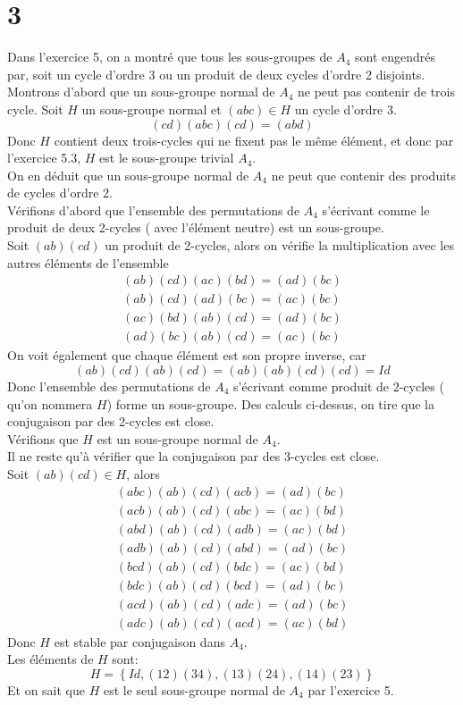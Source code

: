 \documentclass[11pt, a4paper, twoside]{article}
\begin{document}
\section*{3}
Dans l'exercice 5, on a montré que tous les sous-groupes de $A_4$ sont engendrés par, soit un cycle d'ordre 3 ou un produit de deux cycles d'ordre 2 disjoints.\\
Montrons d'abord que un sous-groupe normal de $A_4$ ne peut pas contenir de trois cycle.
Soit $H$ un sous-groupe normal et $( abc)\in H $ un cycle d'ordre 3.
\[ 
	( cd)(abc ) ( cd) = ( abd) 
\]
Donc $H$ contient deux trois-cycles qui ne fixent pas le même élément, et donc par l'exercice 5.3, $H$ est le sous-groupe trivial $A_4$.\\
On en déduit que un sous-groupe normal de $A_4$ ne peut que contenir des produits de cycles d'ordre 2.\\
Vérifions d'abord que l'ensemble des permutations de $A_4$ s'écrivant comme le produit de deux 2-cycles ( avec l'élément neutre)  est un sous-groupe.\\
Soit $( ab) ( cd) $ un produit de 2-cycles, alors on vérifie la multiplication avec les autres éléments de l'ensemble
\begin{align*}
	( ab) ( cd) ( ac) ( bd) = ( ad) ( bc) \\
	( ab) ( cd) ( ad) ( bc) = ( ac) ( bc) \\
	( ac) ( bd) ( ab) ( cd)= ( ad) ( bc) \\
	 ( ad) ( bc) ( ab) ( cd)= ( ac) ( bc)
\end{align*}
On voit également que chaque élément est son propre inverse, car
\[ 
	( ab) ( cd) ( ab) ( cd) = ( ab) ( ab) ( cd) ( cd) = Id
\]
Donc l'ensemble des permutations de $A_4$ s'écrivant comme produit de 2-cycles ( qu'on nommera $H$) forme un sous-groupe.
Des calculs ci-dessus, on tire que la conjugaison par des 2-cycles est close.\\
Vérifions que $H$ est un sous-groupe normal de $A_4$.\\
Il ne reste qu'à vérifier que la conjugaison par des 3-cycles est close.\\
Soit $( ab) ( cd) \in H$, alors
\begin{align*}
	( abc) ( ab) ( cd) ( acb) = ( ad) ( bc)\\
	( acb) ( ab) ( cd) ( abc) = ( ac) ( bd)\\
	( abd) ( ab) ( cd) ( adb) = ( ac) ( bd)\\
	( adb) ( ab) ( cd) ( abd) = ( ad) ( bc)\\
	( bcd) ( ab) ( cd) ( bdc) = ( ac) ( bd)\\
	( bdc) ( ab) ( cd) ( bcd) = ( ad) ( bc)\\
	( acd) ( ab) ( cd) ( adc) = ( ad) ( bc)\\
	( adc) ( ab) ( cd) ( acd) = ( ac) ( bd) 
\end{align*}
Donc $H$ est stable par conjugaison dans $A_4$.\\
Les éléments de $H$ sont:
\[ 
	H = \left\{ Id, ( 12)( 34) , ( 13) ( 24), ( 14)( 23)  \right\} 
\]
Et on sait que $H$ est le seul sous-groupe normal de $A_4$ par l'exercice 5.
\end{document}
